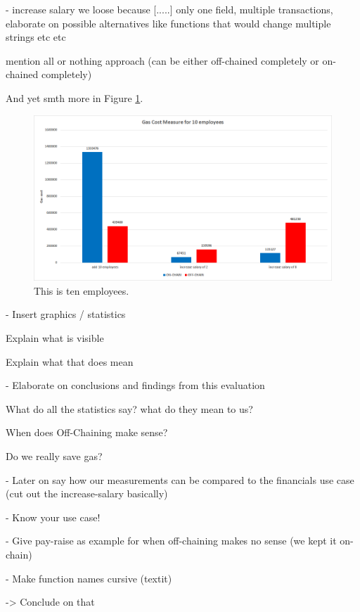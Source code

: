 - increase salary we loose because [.....] only one field, multiple transactions, elaborate on possible alternatives like functions that would change multiple strings etc etc

mention all or nothing approach (can be either off-chained completely or on-chained completely)

And yet smth more in Figure \ref{fig:05_gas_cost_ten}.

\begin{figure}[htbp]
\centering
\includegraphics[width=1.0\textwidth]{images/05_evaluation/05_gas_cost_ten.png}
\caption{\label{fig:05_gas_cost_ten}This is ten employees.}
\end{figure}


- Insert graphics / statistics

Explain what is visible

Explain what that does mean

- Elaborate on conclusions and findings from this evaluation

What do all the statistics say? what do they mean to us?

When does Off-Chaining make sense?

Do we really save gas?

- Later on say how our measurements can be compared to the financials use case (cut out the increase-salary basically)

- Know your use case!

- Give pay-raise as example for when off-chaining makes no sense (we kept it on-chain)

- Make function names cursive (textit)

-> Conclude on that

